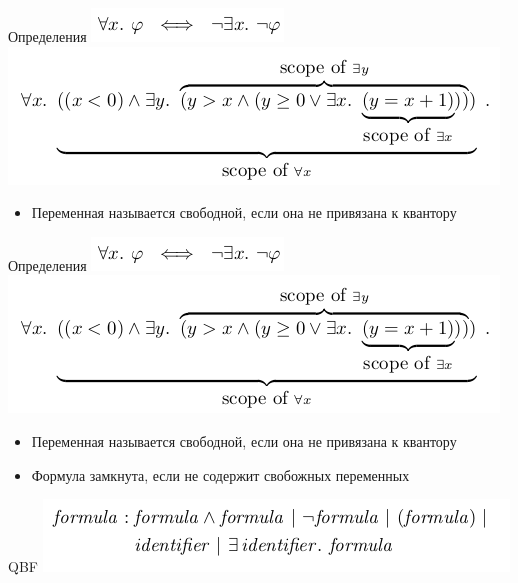 \documentclass{beamer}
\begin{document}
\begin{frame}{Определения}
\includegraphics[scale=0.5]{all_and_exist.png}\newline
\includegraphics[scale=0.5]{scope.png}\newline
\begin{itemize}
\item Переменная называется свободной, если она не привязана к квантору
\end{itemize}
\end{frame}

\begin{frame}{Определения}
\includegraphics[scale=0.5]{all_and_exist.png}\newline
\includegraphics[scale=0.5]{scope.png}\newline
\begin{itemize}
\item Переменная называется свободной, если она не привязана к квантору
\item Формула замкнута, если не содержит свобожных переменных
\end{itemize}
\end{frame}

\begin{frame}{QBF}
\includegraphics[scale=0.5]{qbf.png}\newline
\end{frame}
\end{document}
